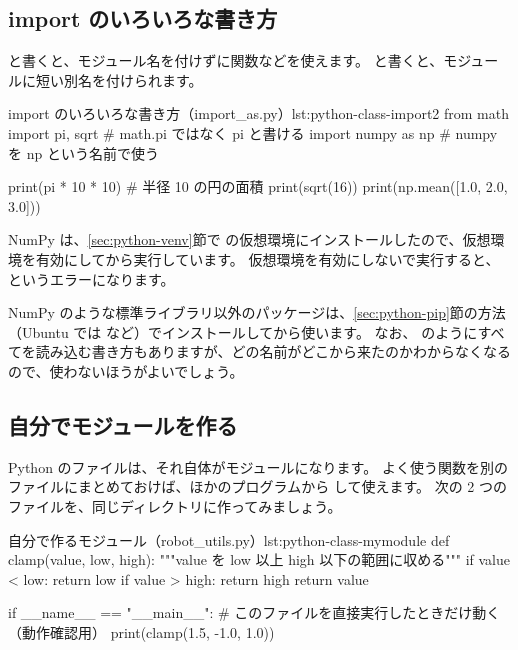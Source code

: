 \subsection{import のいろいろな書き方}

 と書くと、モジュール名を付けずに関数などを使えます。
 と書くと、モジュールに短い別名を付けられます。

\begin{codelisting}[style=python]{import のいろいろな書き方（import\_as.py）}{lst:python-class-import2}
from math import pi, sqrt   # math.pi ではなく pi と書ける
import numpy as np          # numpy を np という名前で使う

print(pi * 10 * 10)         # 半径 10 の円の面積
print(sqrt(16))
print(np.mean([1.0, 2.0, 3.0]))
\end{codelisting}


NumPy は、\ref{sec:python-venv}節で  の仮想環境にインストールしたので、仮想環境を有効にしてから実行しています。
仮想環境を有効にしないで実行すると、 というエラーになります。

NumPy のような標準ライブラリ以外のパッケージは、\ref{sec:python-pip}節の方法（Ubuntu では  など）でインストールしてから使います。
なお、 のようにすべてを読み込む書き方もありますが、どの名前がどこから来たのかわからなくなるので、使わないほうがよいでしょう。

\subsection{自分でモジュールを作る}

Python のファイルは、それ自体がモジュールになります。
よく使う関数を別のファイルにまとめておけば、ほかのプログラムから  して使えます。
次の 2 つのファイルを、同じディレクトリに作ってみましょう。

\begin{codelisting}[style=python]{自分で作るモジュール（robot\_utils.py）}{lst:python-class-mymodule}
def clamp(value, low, high):
    """value を low 以上 high 以下の範囲に収める"""
    if value < low:
        return low
    if value > high:
        return high
    return value


if __name__ == "__main__":
    # このファイルを直接実行したときだけ動く（動作確認用）
    print(clamp(1.5, -1.0, 1.0))
\end{codelisting}

